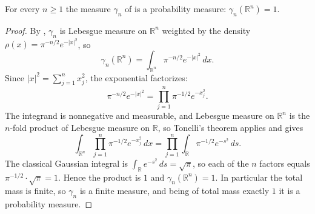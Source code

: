 \begin{lemma}
For every $n \geq 1$ the measure $\gamma_n$ of  is a
probability measure: $\gamma_n(\mathbb{R}^n) = 1$.
\end{lemma}
\begin{proof}
By , $\gamma_n$ is Lebesgue measure on $\mathbb{R}^n$
weighted by the density $\rho(x) = \pi^{-n/2}e^{-|x|^2}$, so
\[
  \gamma_n(\mathbb{R}^n) = \int_{\mathbb{R}^n} \pi^{-n/2} e^{-|x|^2}\, dx .
\]
Since $|x|^2 = \sum_{j=1}^n x_j^2$, the exponential factorizes:
\[
  \pi^{-n/2} e^{-|x|^2}
    = \prod_{j=1}^n \pi^{-1/2} e^{-x_j^2} .
\]
The integrand is nonnegative and measurable, and Lebesgue measure on
$\mathbb{R}^n$ is the $n$-fold product of Lebesgue measure on $\mathbb{R}$, so
Tonelli's theorem applies and gives
\[
  \int_{\mathbb{R}^n} \prod_{j=1}^n \pi^{-1/2}e^{-x_j^2}\, dx
    = \prod_{j=1}^n \int_{\mathbb{R}} \pi^{-1/2} e^{-s^2}\, ds .
\]
The classical Gaussian integral is
$\int_{\mathbb{R}} e^{-s^2}\, ds = \sqrt{\pi}$, so each of the $n$ factors equals
$\pi^{-1/2}\cdot\sqrt{\pi} = 1$.  Hence the product is $1$ and
$\gamma_n(\mathbb{R}^n) = 1$.  In particular the total mass is finite, so
$\gamma_n$ is a finite measure, and being of total mass exactly $1$ it is a
probability measure.
\end{proof}
